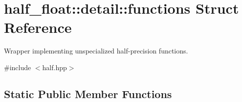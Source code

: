 \hypertarget{structhalf__float_1_1detail_1_1functions}{}\section{half\+\_\+float\+:\+:detail\+:\+:functions Struct Reference}
\label{structhalf__float_1_1detail_1_1functions}


Wrapper implementing unspecialized half-\/precision functions.  




{\ttfamily \#include $<$half.\+hpp$>$}

\subsection*{Static Public Member Functions}
